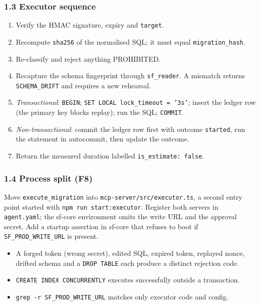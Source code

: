 \documentclass[11pt,a4paper]{article}
\newcommand{\fp}[1]{\nolinkurl{#1}}  %
\begin{document}
\subsubsection*{1.3 Executor sequence}
\begin{enumerate}[leftmargin=*,label=\arabic*.]
  \item Verify the HMAC signature, expiry and \fp{target}.
  \item Recompute \fp{sha256} of the normalised SQL; it must equal \fp{migration_hash}.
  \item Re-classify and reject anything PROHIBITED.
  \item Recapture the schema fingerprint through \fp{sf_reader}. A mismatch returns
        \fp{SCHEMA_DRIFT} and requires a new rehearsal.
  \item \emph{Transactional}: \texttt{BEGIN}; \texttt{SET LOCAL lock\_timeout = '3s'};
        insert the ledger row (the primary key blocks replay); run the SQL; \texttt{COMMIT}.
  \item \emph{Non-transactional}: commit the ledger row first with outcome \texttt{started},
        run the statement in autocommit, then update the outcome.
  \item Return the measured duration labelled \texttt{is\_estimate: false}.
\end{enumerate}

\subsubsection*{1.4 Process split (F8)}
Move \fp{execute_migration} into \fp{mcp-server/src/executor.ts}, a second entry point started with
\texttt{npm run start:executor}. Register both servers in \fp{agent.yaml}; the sf-core
environment omits the write URL and the approval secret. Add a startup assertion in
sf-core that refuses to boot if \fp{SF_PROD_WRITE_URL} is present.

\begin{acceptbox}
\begin{itemize}[leftmargin=*]
  \item A forged token (wrong secret), edited SQL, expired token, replayed nonce,
        drifted schema and a \texttt{DROP TABLE} each produce a distinct rejection code.
  \item \texttt{CREATE INDEX CONCURRENTLY} executes successfully outside a transaction.
  \item \texttt{grep -r SF\_PROD\_WRITE\_URL} matches only executor code and config.
\end{itemize}
\end{acceptbox}
\end{document}
